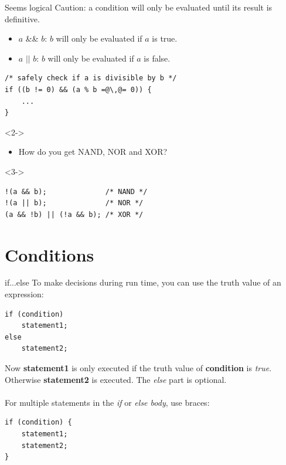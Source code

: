 \begin{frame}[fragile]{Seems logical}
	Caution: a condition will only be evaluated until its result is definitive.
	\begin{itemize}
	\item $a$ \&\& $b$: $b$ will only be evaluated if $a$ is true.
	\item $a$ $||$ $b$: $b$ will only be evaluated if $a$ is false.
	\end{itemize}
	\begin{lstlisting}[numbers=none]
/* safely check if a is divisible by b */
if ((b != 0) && (a % b =@\,@= 0)) {
    ...
}
\end{lstlisting} 
	\bigskip
	\begin{uncoverenv}<2->
		\begin{itemize}
			\item How do you get NAND, NOR and XOR?
		\end{itemize}
	\end{uncoverenv}
	\begin{uncoverenv}<3->
		\begin{lstlisting}[numbers=none]
!(a && b);              /* NAND */
!(a || b);              /* NOR */
(a && !b) || (!a && b); /* XOR */
\end{lstlisting}
	\end{uncoverenv}
\end{frame}

\section{Conditions}

\begin{frame}[fragile]{if...else}
	To make decisions during run time, you can use the truth value of an expression:
	\begin{lstlisting}[numbers=none,basicstyle=\itshape\footnotesize]
if (condition)
    statement1;
else
    statement2;
\end{lstlisting}
	Now \textbf{statement1} is only executed if the truth value of \textbf{condition} is \textit{true}. Otherwise \textbf{statement2} is executed. The \textit{else} part is optional.\\\ \\
	For multiple statements in the \textit{if} or \textit{else body}, use braces:
	\begin{lstlisting}[numbers=none,basicstyle=\itshape\footnotesize]
if (condition) {
    statement1;
    statement2;
}
\end{lstlisting}
\end{frame}

